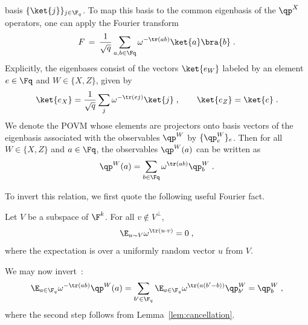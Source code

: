 basis $\{\ket{j}\}_{j \in \F_q}$.
To map this basis to the common eigenbasis of the $\qp^X$ operators, one can
apply the Fourier transform
\begin{equation}
  \label{eq:fourier-f}
  F \,=\, \frac{1}{\sqrt{q}} \sum_{a, b\in \Fq} \omega^{-\tr(ab)}
  \ket{a}\bra{b}\;.
\end{equation}
Explicitly, the eigenbases consist of the vectors $\ket{e_W}$ labeled by an
element $e \in \Fq$ and $W \in \{X, Z\}$, given by
\begin{equation*}
  \ket{e_X} = \frac{1}{\sqrt{q}} \sum_j \omega^{- \tr(e j)} \ket{j}\;, \qquad
  \ket{e_Z}   = \ket{e}\;.
\end{equation*}
We denote the POVM whose elements are projectors onto basis vectors of the
eigenbasis associated with the observables $\qp^W$ by $\{\qp^W_e\}_e$.
Then for all $W \in \{X,Z\}$ and $a\in \Fq$, the observables $\qp^W(a)$ can be
written as
\begin{equation}\label{eq:pauli-obs-proj-single}
  \qp^W(a) = \sum_{b \in \Fq} \omega^{\tr(a b)} \qp^W_b\;.
\end{equation}

To invert this relation, we first quote the following useful Fourier fact.
\begin{lemma}
  \label{lem:cancellation}
  Let $V$ be a subspace of $\F^k$. For all $v \not\in V^\perp$, 
  \begin{equation*}
    \E_{u \sim V} \omega^{\tr(u \cdot v)} = 0\;,
  \end{equation*}
  where the expectation is over a uniformly random vector $u$ from $V$.
\end{lemma}

We may now invert~:
\begin{equation}\label{eq:pauli-inversion-0-single}
  \E_{a\in \F_q} \omega^{-\tr(ab)} \qp^W(a) = \sum_{b'\in \F_q} \E_{a\in \F_q}
  \omega^{\tr(a(b'-b))} \qp^W_{b'} = \qp^W_b\;,
\end{equation}
where the second step follows from Lemma~\ref{lem:cancellation}.

